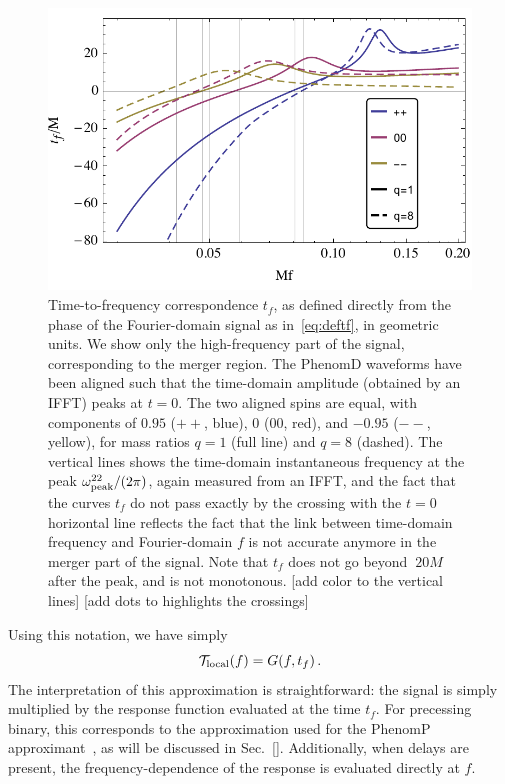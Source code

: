 \documentclass[aps,showpacs,twocolumn,
prd,superscriptaddress,nofootinbib]{revtex4-1}
\newcommand{\be}{\begin{equation}}
\newcommand{\ee}{\end{equation}}
\newcommand\calT{{\mathcal{T}}}
\newcommand{\tf}{t_{f}}
\newcommand{\SM}[1]{{\color{Red} #1}}
\begin{document}
\begin{figure}
  \centering
  \includegraphics[width=.98\linewidth]{plots/tf.pdf}
  \caption{Time-to-frequency correspondence $t_{f}$, as defined directly from the phase of the Fourier-domain signal as in~\eqref{eq:deftf}, in geometric units. We show only the high-frequency part of the signal, corresponding to the merger region. The PhenomD waveforms have been aligned such that the time-domain amplitude (obtained by an IFFT) peaks at $t=0$. The two aligned spins are equal, with components of $0.95$ ($++$, blue), $0$ ($00$, red), and $-0.95$ ($--$, yellow), for mass ratios $q=1$ (full line) and $q=8$ (dashed). The vertical lines shows the time-domain instantaneous frequency at the peak $\omega^{22}_{\rm peak}/(2\pi)$, again measured from an IFFT, and the fact that the curves $t_{f}$ do not pass exactly by the crossing with the $t=0$ horizontal line reflects the fact that the link between time-domain frequency and Fourier-domain $f$ is not accurate anymore in the merger part of the signal. Note that $t_{f}$ does not go beyond $~20M$ after the peak, and is not monotonous. \SM{[add color to the vertical lines]} \SM{[add dots to highlights the crossings]}}
  \label{fig:tf}
\end{figure}

Using this notation, we have simply
\be\label{eq:transferlocal}
	\calT_{\rm local}(f) = G(f, \tf) \,.
\ee
The interpretation of this approximation is straightforward: the signal is simply multiplied by the response function evaluated at the time $\tf$. For precessing binary, this corresponds to the approximation used for the PhenomP approximant~\cite{Hannam+13}, as will be discussed in Sec.~\ref{}. Additionally, when delays are present, the frequency-dependence of the response is evaluated directly at $f$.
\end{document}
